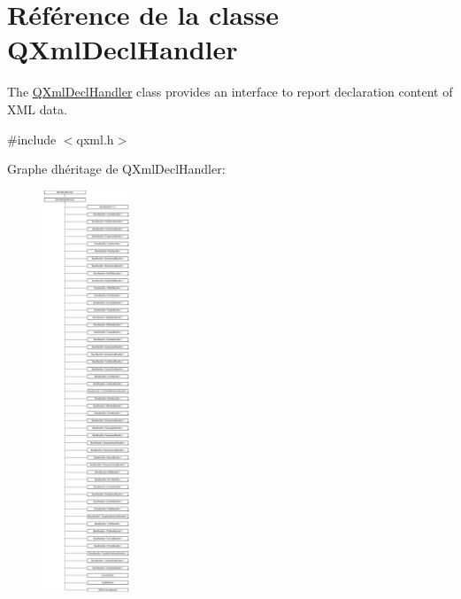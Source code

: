 \hypertarget{class_q_xml_decl_handler}{}\section{Référence de la classe Q\+Xml\+Decl\+Handler}
\label{class_q_xml_decl_handler}


The \hyperlink{class_q_xml_decl_handler}{Q\+Xml\+Decl\+Handler} class provides an interface to report declaration content of X\+M\+L data.  




{\ttfamily \#include $<$qxml.\+h$>$}

Graphe d\textquotesingle{}héritage de Q\+Xml\+Decl\+Handler\+:\begin{figure}[H]
\begin{center}
\leavevmode
\includegraphics[height=12.000000cm]{class_q_xml_decl_handler}
\end{center}
\end{figure}
